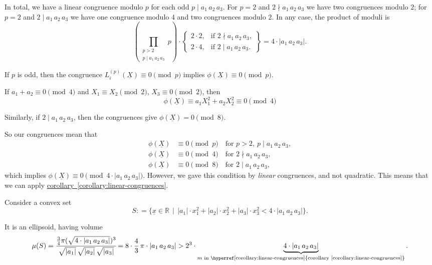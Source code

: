 \documentclass{article}
\newcommand{\dfn}{\mathrel{\mathop:}=}
\newcommand{\refref}[2]{\hyperref[#2]{#1~\ref*{#2}}}
\theoremstyle{myplain}
\theoremstyle{mydefinition}
\begin{document}
In total, we have a linear congruence modulo $p$ for each odd
$p \mid a_1\,a_2\,a_3$. For $p = 2$ and $2 \nmid a_1\,a_2\,a_3$ we have two
congruences modulo $2$; for $p = 2$ and $2 \mid a_1\,a_2\,a_3$ we have one
congruence modulo $4$ and two congruences modulo $2$. In any case, the product
of moduli is
\[ (\prod_{\substack{p > 2 \\ p \mid a_1\,a_2\,a_3}} p) \cdot
  \left\{\begin{array}{ll}
           2\cdot 2, & \text{if } 2 \nmid a_1\,a_2\,a_3,\\
           2\cdot 4, & \text{if } 2 \mid a_1\,a_2\,a_3.
         \end{array}\right\} = 4\cdot|a_1\,a_2\,a_3|. \]

If $p$ is odd, then the congruence $L_i^{(p)} (\underline{X}) \equiv 0 \pmod{p}$
implies $\phi (\underline{X}) \equiv 0 \pmod{p}$.

If $a_1 + a_2 \equiv 0 \pmod{4}$ and $X_1 \equiv X_2 \pmod{2}$,
$X_3 \equiv 0 \pmod{2}$, then
$$\phi (\underline{X}) \equiv a_1 X_1^2 + a_2 X_2^2 \equiv 0 \pmod{4}$$

Similarly, if $2 \mid a_1\,a_2\,a_3$, then the congruences give
$\phi (\underline{X}) = 0 \pmod{8}$.

So our congruences mean that
\begin{align*}
  \phi (\underline{X}) & \equiv 0 \pmod{p} \quad \text{for } p > 2, ~ p \mid a_1\,a_2\,a_3,\\
  \phi (\underline{X}) & \equiv 0 \pmod{4} \quad \text{for } 2\nmid a_1\,a_2\,a_3,\\
  \phi (\underline{X}) & \equiv 0 \pmod{8} \quad \text{for } 2 \mid a_1\,a_2\,a_3,
\end{align*}
which implies
$\phi (\underline{X}) \equiv 0 \pmod{4\cdot |a_1\,a_2\,a_3|}$. However, we gave
this condition by \emph{linear} congruences, and not quadratic. This means that
we can apply \refref{corollary}{corollary:linear-congruences}.

Consider a convex set
\[ S \dfn \{ \underline{x} \in \mathbb{R} \,\mid\, |a_1| \cdot x_1^2 + |a_2| \cdot x_2^2 + |a_3| \cdot x_3^2 < 4\cdot |a_1\,a_2\,a_3| \}. \]

It is an ellipsoid, having volume
\[ \mu (S) = \cfrac{\frac{3}{4} \pi (\sqrt{4 \cdot |a_1\,a_2\,a_3|})^3}{\sqrt{|a_1|} \, \sqrt{|a_2|} \, \sqrt{|a_3|}} =
  8\cdot \frac{4}{3}\,\pi \cdot |a_1\,a_2\,a_3| >
  2^3 \cdot \underbrace{4\cdot |a_1\,a_2\,a_3|}_{m\text{ in \refref{corollary}{corollary:linear-congruences}}}. \]
\end{document}

